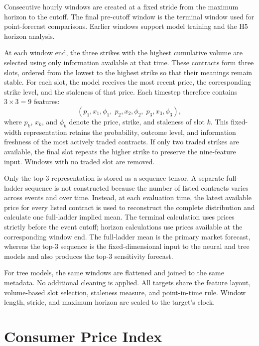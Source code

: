 \documentclass[12pt,a4paper]{report}
\begin{document}
Consecutive hourly windows are created at a fixed stride from the maximum
horizon to the cutoff. The final pre-cutoff window is the terminal window used
for point-forecast comparisons. Earlier windows support model training and the
H5 horizon analysis.

At each window end, the three strikes with the highest cumulative volume are
selected using only information available at that time. These contracts form
three slots, ordered from the lowest to the highest strike so that their
meanings remain stable. For each slot, the model receives the most recent
price, the corresponding strike level, and the staleness of that price. Each
timestep therefore contains $3 \times 3 = 9$ features:
\begin{equation}
\label{eq:nine-feature-timestep}
(p_1,x_1,\phi_1,\;p_2,x_2,\phi_2,\;p_3,x_3,\phi_3),
\end{equation}
where $p_k$, $x_k$, and $\phi_k$ denote the price, strike, and staleness of
slot $k$. This fixed-width representation retains the probability, outcome
level, and information freshness of the most actively traded contracts. If
only two traded strikes are available, the final slot repeats the higher
strike to preserve the nine-feature input. Windows with no traded slot are
removed.

Only the top-3 representation is stored as a sequence tensor. A separate
full-ladder sequence is not constructed because the number of listed
contracts varies across events and over time. Instead, at each evaluation
time, the latest available price for every listed contract is used to
reconstruct the complete distribution and calculate one full-ladder implied
mean. The terminal calculation uses prices strictly before the event cutoff;
horizon calculations use prices available at the corresponding window end.
The full-ladder mean is the primary market forecast, whereas the top-3
sequence is the fixed-dimensional input to the neural and tree models and
also produces the top-3 sensitivity forecast.

For tree models, the same windows are flattened and joined to the same
metadata. No additional cleaning is applied. All targets share the feature
layout, volume-based slot selection, staleness measure, and point-in-time rule.
Window length, stride, and maximum horizon are scaled to the target's clock.


\section{Consumer Price Index}
\label{sec:data-cpi}
\end{document}
